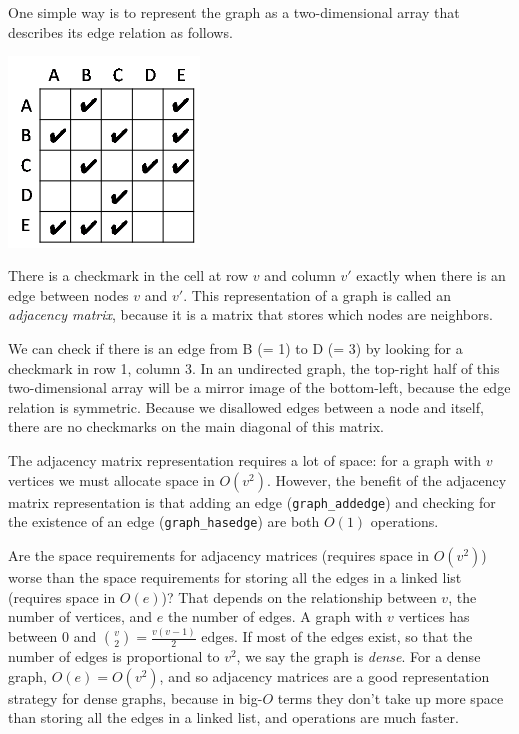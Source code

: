 One simple way is to represent the graph as a two-dimensional array that
describes its edge relation as follows.
\begin{center}
  \includegraphics[width=0.38\textwidth]{img/adj-matrix0.png}
\end{center}
There is a checkmark in the cell at row $v$ and column $v'$ exactly when there
is an edge between nodes $v$ and $v'$.  This representation of a graph is
called an \emph{adjacency matrix}, because it is a matrix that stores which
nodes are neighbors.

We can check if there is an edge from B (= 1) to D (= 3) by looking
for a checkmark in row 1, column 3. In an undirected graph, the
top-right half of this two-dimensional array will be a mirror image of
the bottom-left, because the edge relation is symmetric.  Because we
disallowed edges between a node and itself, there are no checkmarks on
the main diagonal of this matrix.

The adjacency matrix representation requires a lot of space: for a graph
with $v$ vertices we must allocate space in $O(v^2)$. However, the
benefit of the adjacency matrix representation is that adding an edge
(\lstinline'graph_addedge') and checking for the existence of an edge
(\lstinline'graph_hasedge') are both $O(1)$ operations.

Are the space requirements for adjacency matrices (requires space in
$O(v^2)$) worse than the space requirements for storing all the edges
in a linked list (requires space in $O(e)$)? That depends on the
relationship between $v$, the number of vertices, and $e$ the number
of edges. A graph with $v$ vertices has between 0 and ${v\choose 2} =
\frac{v(v-1)}{2}$ edges. If most of the edges exist, so that the
number of edges is proportional to $v^2$, we say the graph is
\emph{dense}. For a dense graph, $O(e) = O(v^2)$, and so adjacency
matrices are a good representation strategy for dense graphs, because
in big-$O$ terms they don't take up more space than storing all the
edges in a linked list, and operations are much faster.


